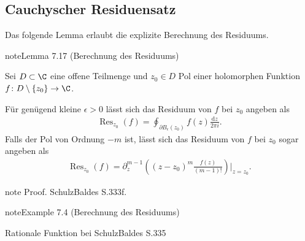 \documentclass[letterpaper,10pt,german]{jupyterBook}
\begin{document}
\subsection{Cauchyscher Residuensatz}
\label{\detokenize{complexanalysis/residuensatz:cauchyscher-residuensatz}}
\sphinxAtStartPar
Das folgende Lemma erlaubt die explizite Berechnung des Residuums.
\label{complexanalysis/residuensatz:lemma-12}
\begin{sphinxadmonition}{note}{Lemma 7.17 (Berechnung des Residuums)}



\sphinxAtStartPar
Sei \(D \subset \C\) eine offene Teilmenge und \(z_0 \in D\) Pol einer holomorphen Funktion \(f \colon D \setminus \{z_0\} \rightarrow \C\).

\sphinxAtStartPar
Für genügend kleine \(\epsilon > 0\) lässt sich das Residuum von \(f\) bei \(z_0\) angeben als
\begin{equation*}
\begin{split}\operatorname{Res}_{z_0}(f) = \oint_{\partial B_\epsilon(z_0)} f(z) \frac{\mathrm{d}z}{2\pi i}.\end{split}
\end{equation*}
\sphinxAtStartPar
Falls der Pol von Ordnung \(-m\) ist, lässt sich das Residuum von \(f\) bei \(z_0\) sogar angeben als
\begin{equation*}
\begin{split}\operatorname{Res}_{z_0}(f) = \partial_z^{m-1}\left( (z-z_0)^m \frac{f(z)}{(m-1)!}\right)|_{z=z_0}.\end{split}
\end{equation*}\end{sphinxadmonition}

\begin{sphinxadmonition}{note}
\sphinxAtStartPar
Proof. Schulz\sphinxhyphen{}Baldes S.333f.
\end{sphinxadmonition}
\label{complexanalysis/residuensatz:example-13}
\begin{sphinxadmonition}{note}{Example 7.4 (Berechnung des Residuums)}



\sphinxAtStartPar
Rationale Funktion bei Schulz\sphinxhyphen{}Baldes S.335
\end{sphinxadmonition}
\end{document}
